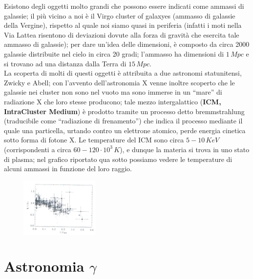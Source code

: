 Esistono degli oggetti molto grandi che possono essere indicati come ammassi di galassie; il più vicino a noi è il Virgo cluster of galaxyes (ammasso di galassie della Vergine), rispetto al quale noi siamo quasi in periferia (infatti i moti nella Via Lattea risentono di deviazioni dovute alla forza di gravità che esercita tale ammasso di galassie); per dare un'idea delle dimensioni, è composto da circa 2000 galassie distribuite nel cielo in circa 20 gradi; l'ammasso ha dimensioni di $1 \, Mpc$ e si trovano ad una distanza dalla Terra di $15 \, Mpc$.\\
La scoperta di molti di questi oggetti è attribuita a due astronomi statunitensi, Zwicky e Abell; con l'avvento dell'astronomia X venne inoltre scoperto che le galassie nei cluster non sono nel vuoto ma sono immerse in un ``mare'' di radiazione X che loro stesse producono; tale mezzo intergalattico (\textbf{ICM, IntraCluster Medium}) è prodotto tramite un processo detto bremmstrahlung (traducibile come ``radiazione di frenamento'') che indica il processo mediante il quale una particella, urtando contro un elettrone atomico, perde energia cinetica sotto forma di fotone X. Le temperature del ICM sono circa $5-10 \, KeV$ (corrispondenti a circa $60-120 \cdot 10^3 \, K$), e dunque la materia si trova in uno stato di plasma; nel grafico  riportato qua sotto possiamo vedere le temperature di alcuni ammassi in funzione del loro raggio.

\begin{figure}[h!]
	\centering
	\includegraphics[width=0.35\textwidth]{Img/bertin_12.png}
\end{figure}

\section{Astronomia $\gamma$}

